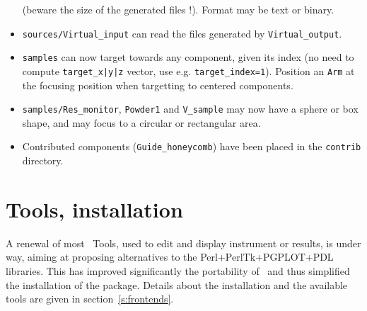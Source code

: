 \begin{itemize}
    (beware the size of the generated files !). Format may be text or binary.
\item \verb+sources/Virtual_input+ can read the files generated by \verb+Virtual_output+.
\item \verb+samples+ can now target towards any component, given its index 
    (no need to compute \verb+target_x|y|z+ vector, use e.g. \verb+target_index=1+). 
    Position an \verb+Arm+ at the focusing position when targetting to 
    centered components.
\item \verb+samples/Res_monitor+, \verb+Powder1+ and \verb+V_sample+ may now have a
    sphere or box shape, and may focus to a circular or rectangular area.
\item Contributed components (\verb+Guide_honeycomb+) have been
    placed in the \verb+contrib+ directory. 
\end{itemize}

\section{Tools, installation}
\label{s:new-features:tools}
  A renewal of most \MCS\ Tools, used to edit and display instrument or results, is under way, aiming at proposing alternatives to the Perl+PerlTk+PGPLOT+PDL libraries.
  This has improved significantly the portability of \MCS\ and thus simplified the
  installation of the package. Details about the installation and the available tools are given in section~\ref{s:frontends}.

